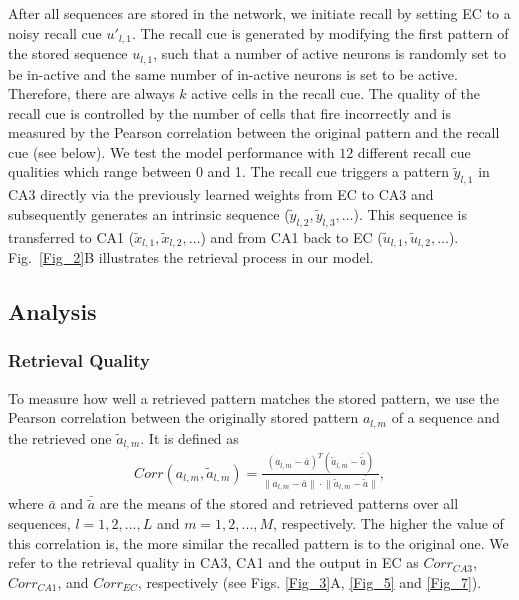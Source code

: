 \documentclass[utf8]{frontiersSCNS} %
\begin{document}
After all sequences are stored in the network, we initiate recall by setting EC to a noisy recall cue $u'_{l, 1}$.  The recall cue is generated by modifying the first pattern of the stored sequence $u_{l, 1}$, such that a number of active neurons is randomly set to be in-active and the same number of in-active neurons is set to be active. Therefore, there are always $k$ active cells in the recall cue. The quality of the recall cue is controlled by the number of cells that fire incorrectly and is measured by the Pearson correlation between the original pattern and the recall cue (see below). We test the model performance with $12$ different recall cue qualities which range between 0 and 1.      
%
The recall cue triggers a pattern $\tilde{y}_{l, 1}$ in CA3 directly via the previously learned weights from EC to CA3 and subsequently generates an intrinsic sequence ($\tilde{y}_{l, 2}, \tilde{y}_{l, 3}, \ldots$). This sequence is transferred to CA1 ($\tilde{x}_{l, 1}, \tilde{x}_{l, 2}, \ldots$) and from CA1 back to EC ($\tilde{u}_{l, 1}, \tilde{u}_{l, 2}, \ldots$). Fig.~\ref{Fig_2}B illustrates the retrieval process in our model. 


\subsection{Analysis}

\subsubsection{Retrieval Quality}
To measure how well a retrieved pattern matches the stored pattern, we use the Pearson correlation between the originally stored pattern $a_{l, m}$ of a sequence  and the retrieved one $\tilde{a}_{l, m}$. It is defined as
\begin{align*}
	Corr(a_{l, m},\tilde{a}_{l, m})  = \frac{(a_{l, m} -\bar{a})^T(\tilde{a}_{l, m} -\bar{\tilde{a}})}
{\lVert{a_{l, m} -\bar{a}} \rVert \cdot \lVert{\tilde{a}_{l, m} -\bar{\tilde{a}}}\rVert },
\end{align*}     
where $\bar{a}$ and $\bar{\tilde{a}}$ are the means of the stored and retrieved patterns over all sequences, $l = 1,2, ..., L$ and $m = 1,2, ..., M$, respectively. The higher the value of this correlation is, the more similar the recalled pattern is to the original one. We refer to the retrieval quality in CA3, CA1 and the output in EC as $Corr_{CA3}$, $Corr_{CA1}$, and $Corr_{EC}$, respectively (see Figs. \ref{Fig_3}A, \ref{Fig_5} and \ref{Fig_7}).
\end{document}
